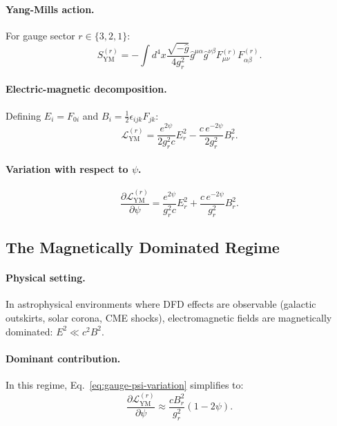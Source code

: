 \paragraph{Yang-Mills action.}
For gauge sector $r \in \{3, 2, 1\}$:
\begin{equation}
S_{\text{YM}}^{(r)} = -\int d^4x \frac{\sqrt{-\hat{g}}}{4g_r^2} \hat{g}^{\mu\alpha}\hat{g}^{\nu\beta} F_{\mu\nu}^{(r)} F_{\alpha\beta}^{(r)}.
\end{equation}

\paragraph{Electric-magnetic decomposition.}
Defining $E_i = F_{0i}$ and $B_i = \frac{1}{2}\epsilon_{ijk}F_{jk}$:
\begin{equation}
\mathcal{L}_{\text{YM}}^{(r)} = \frac{e^{2\psi}}{2g_r^2 c}E_r^2 - \frac{c\,e^{-2\psi}}{2g_r^2}B_r^2.
\end{equation}

\paragraph{Variation with respect to $\psi$.}
\begin{equation}\label{eq:gauge-psi-variation}
\frac{\partial \mathcal{L}_{\text{YM}}^{(r)}}{\partial \psi} = \frac{e^{2\psi}}{g_r^2 c}E_r^2 + \frac{c\,e^{-2\psi}}{g_r^2}B_r^2.
\end{equation}

\subsection{The Magnetically Dominated Regime}\label{app:magnetic-dominance}

\paragraph{Physical setting.}
In astrophysical environments where DFD effects are observable (galactic outskirts, solar corona, CME shocks), electromagnetic fields are magnetically dominated: $E^2 \ll c^2 B^2$.

\paragraph{Dominant contribution.}
In this regime, Eq.~\eqref{eq:gauge-psi-variation} simplifies to:
\begin{equation}
\frac{\partial \mathcal{L}_{\text{YM}}^{(r)}}{\partial \psi} \approx \frac{c B_r^2}{g_r^2}(1 - 2\psi).
\end{equation}

